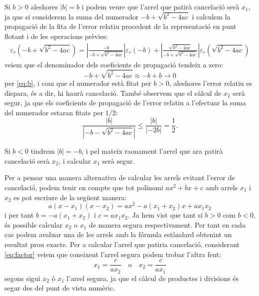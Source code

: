\documentclass[12pt]{article}
\newcommand{\abs}[1]{\left\lvert#1\right\rvert}
\begin{document}
Si $b>0$ aleshores \( \abs{b} = b \) i podem veure que l'arrel que patirà cancelació serà $x_1$, ja que si considerem la suma del numerador $-b+\sqrt{b^2-4ac}$ i calculem la propagació de la fita de l'error relatiu procedent de la representació en punt flotant i de les operacions prèvies:
\begin{align*}
	\varepsilon_r(-b+\sqrt{b^2-4ac})=\left|\frac{-b}{-b+\sqrt{b^2-4ac}} \right| \varepsilon_r(-b)+\left|\frac{\sqrt{b^2-4ac}}{-b+\sqrt{b^2-4ac}} \right| \varepsilon_r(\sqrt{b^2-4ac})
\end{align*}
veiem que el denominador dels coeficients de propagació tendeix a zero:
\begin{equation*}
	-b + \sqrt{b^2 - 4ac} \approx -b + b \to 0
\end{equation*}
per \eqref{eq:b}, i com que el numerador està fitat per $b>0$, aleshores l'error relatiu es dispara, és a dir, hi haurà cancelació. També observem que el càlcul de $x_2$ serà segur, ja que els coeficients de propagació de l'error relatiu a l'efectuar la suma del numerador estaran fitats per $1/2$:
\begin{equation*}
  \frac{|b|}{|-b-\sqrt{b^2-4ac}|}\leq\frac{|b|}{|-2b|}=\frac{1}{2}.
\end{equation*}

Si $b<0$ tindrem \( \abs{b} = -b \), i pel mateix raonament l'arrel que ara patirà cancelació serà $x_2$, i calcular $x_1$ serà segur.

Per a pensar una manera alternativa de calcular les arrels evitant l'error de cancelació, podem tenir en compte que tot polinomi $ax^2+bx+c$ amb arrels $x_1$ i $x_2$ es pot escriure de la següent manera:
\begin{equation}\label{eq:factor}
  a(x-x_1)(x-x_2)=ax^2-a(x_1+x_2)x+ax_1x_2
\end{equation}
i per tant $b=-a(x_1+x_2)$ i $c=ax_1x_2$. Ja hem vist que tant si $b>0$ com $b<0$, és possible calcular $x_2$ o $x_1$ de manera segura respectivament. Per tant en cada cas podem avaluar una de les arrels amb la fórmula estàndard obtenint un resultat prou exacte. Per a calcular l'arrel que patiria cancelació, considerant \eqref{eq:factor} veiem que coneixent l'arrel segura podem trobar l'altra fent:
\begin{equation*}
	x_1=\frac{c}{ax_2}\quad \text{o} \quad x_2=\frac{c}{ax_1}
\end{equation*}
segons sigui $x_2$ ó $x_1$ l'arrel segura, ja que el càlcul de productes i divisions és segur des del punt de vista numèric.
\end{document}

